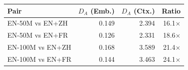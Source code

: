 \begin{tabular}{@{}lrrr@{}}
\toprule
Pair & $D_A$ (Emb.) & $D_A$ (Ctx.) & Ratio \\
\midrule
EN-50M vs EN+ZH & 0.149 & 2.394 & 16.1$\times$ \\
EN-50M vs EN+FR & 0.126 & 2.331 & 18.6$\times$ \\
EN-100M vs EN+ZH & 0.168 & 3.589 & 21.4$\times$ \\
EN-100M vs EN+FR & 0.144 & 3.463 & 24.1$\times$ \\
\bottomrule
\end{tabular}
